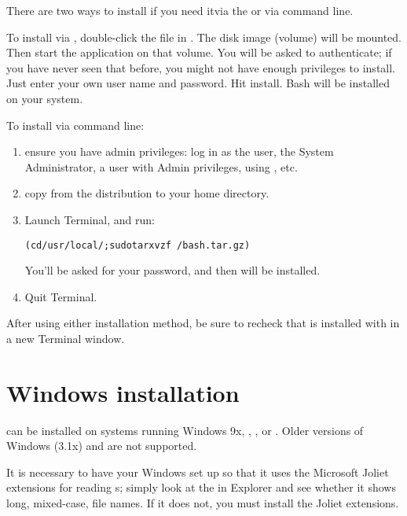\documentclass{article}
\begin{document}
There are two ways to install  if you need it\Dash via the
 or via command line.

To install via , double-click the 
file in \TeXLive{}.  The disk image (volume) will be mounted.  Then
start the  application on that volume. You will be
asked to authenticate; if you have never seen that before, you might not
have enough privileges to install. Just enter your own user name and
password. Hit install. Bash will be installed on your system.

To install via command line:
\begin{enumerate}
\item ensure you have admin privileges: log in as the
 user, the System Administrator, a user with Admin
privileges, using , etc.

\item copy  from the \TeXLive{}
distribution to your home directory.

\item Launch Terminal, and run:
\begin{alltt}
(cd /usr/local/; sudo tar xvzf ~/bash.tar.gz)
\end{alltt}
You'll be asked for your password, and then  will be
installed.

\item Quit Terminal.

\end{enumerate}

After using either installation method, be sure to recheck that
 is installed with  in a new
Terminal window.


\section{Windows installation}
\label{sec:win-install}

\TeXLive{} can be installed on systems running Windows 9x, ,
,  or .  Older versions of Windows (3.1x)
and  are not supported.

It is necessary to have your Windows set up so that it uses the
Microsoft Joliet extensions for reading \CD{}s; simply look at the \CD{}
in Explorer and see whether it shows long, mixed-case, file names. If it
does not, you must install the Joliet extensions.
\end{document}
